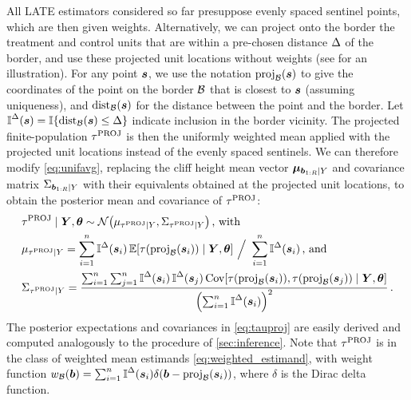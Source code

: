 All LATE estimators considered so far presuppose evenly spaced sentinel points, which are then given weights.
Alternatively, we can project onto the border the treatment and control units that are within a pre-chosen distance \(\Delta\) of the border, and use these projected unit locations without weights (see \ofsupp{} for an illustration).
For any point \(\bm{s}\), we use the notation \(\proj_{\border}\del{\svec}\) to give the coordinates of the point on the border \(\mathcal{B}\) that is closest to \(\bm{s}\) (assuming uniqueness), and \(\dist_{\border}\del{\svec}\) for the distance between the point and the border.
Let \(\vicinity{\svec} = \allowbreak \Ind\cbr{\dist_{\border}\del{\svec} \le \buffer} \) indicate inclusion in the border vicinity.
The projected finite-population \(\tau^{\mathrm{PROJ}}\) is then the uniformly weighted mean applied with the projected unit locations instead of the evenly spaced sentinels.
We can therefore modify \autoref{eq:unifavg}, replacing the cliff height mean vector \(\bm{\mu}_{\bm{b}_{1:R} \mid Y}\)
and covariance matrix \(\Sigma_{\bm{b}_{1:R} \mid Y}\)
with their equivalents obtained at the projected unit locations,
to obtain the posterior mean and covariance of \(\tau^{\mathrm{PROJ}}\):
\begin{equation}\begin{split}
    &\tauproj \mid \Yvec, \hyperparam \sim \normal\del{\mu_{\tauproj \mid Y}, \Sigma_{\tauproj \mid Y}}\,\text{, with} \\
    &\mu_{\tauproj \mid Y} = 
    \sum_{i=1}^{n}
    \vicinity{\svec_i}
    \E\sbr{
        \tau\del{
            \proj_{\border}\del{\svec_i}
        }
        \mid \Yvec, \hyperparam
    } 
    \ 
    \Big/
    \ 
        \sum_{i=1}^{n}
        \vicinity{\svec_i}
    \,\text{, and}\\
    &\Sigma_{\tauproj \mid Y} = 
    \frac{
        \sum_{i=1}^{n} 
        \sum_{j=1}^{n} 
        \vicinity{\svec_i}
        \vicinity{\svec_j}
        \cov\sbr{
            \tau\del{
                \proj_{\border}\del{\svec_i}
            },
            \tau\del{
                \proj_{\border}\del{\svec_j}
            }
            \mid \Yvec, \hyperparam
        }
    }{
        \del{
            \sum_{i=1}^{n}
            \vicinity{\svec_i}
        }^2
    }
    \,.
\end{split}
\label{eq:tauproj}
\end{equation}
The posterior expectations and covariances in \autoref{eq:tauproj} are easily derived and computed analogously to the procedure of \autoref{sec:inference}.
Note that \(\tau^{\mathrm{PROJ}}\) is in the class of weighted mean estimands \autoref{eq:weighted_estimand},
with weight function \(\weightb(\sentinel) = \sum_{i=1}^{n} \vicinity{\svec_i} \delta\del{ \sentinel - \proj_\border(\svec_i)}\), where \(\delta\) is the Dirac delta function.

